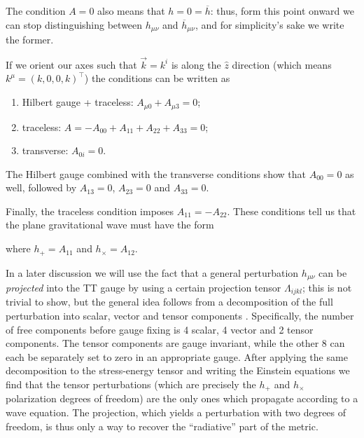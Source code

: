 \documentclass[main.tex]{subfiles}
\begin{document}
The condition \(A = 0\) also means that \(h = 0 = \overline{h}\): thus, form this point onward we can stop distinguishing between \(h_{\mu \nu }\) and  \(\overline{h}_{\mu \nu }\), and for simplicity's sake we write the former. 

If we orient our axes such that \(\vec{k} = k^{i}\) is along the \(\hat{z}\) direction (which means \(k^{\mu } = (k, 0, 0, k)^{\top}\)) the conditions can be written as 
\begin{enumerate}
    \item Hilbert gauge + traceless: \(A_{\mu 0}+ A_{\mu 3} = 0\);
    \item traceless: \(A = - A_{00} + A_{11} + A_{22} + A_{33} = 0 \);
    \item transverse: \(A_{0i} = 0\). 
\end{enumerate}

The Hilbert gauge combined with the transverse conditions show that \(A_{00} = 0\) as well, followed by \(A_{13} = 0\), \(A_{23} = 0\) and \(A_{33} = 0\). 

Finally, the traceless condition imposes \(A_{11} = - A_{22} \).
These conditions tell us that the plane gravitational wave must have the form 
%

%

%
where \(h_+ = A_{11} \) and \(h_\times = A_{12} \). 

In a later discussion we will use the fact that a general perturbation \(h_{\mu \nu }\) can be \emph{projected} into the \ac{TT} gauge by using a certain projection tensor \(\Lambda_{ijkl}\); this is not trivial to show, but the general idea follows from a decomposition of the full perturbation into scalar, vector and tensor components \cite[sec.\ 7.2]{carrollSpacetimeGeometryIntroduction2019}.
Specifically, the number of free components before gauge fixing is 4 scalar, 4 vector and 2 tensor components. 
The tensor components are gauge invariant, while the other 8 can each be separately set to zero in an appropriate gauge.
After applying the same decomposition to the stress-energy tensor and writing the Einstein equations we find that the tensor perturbations (which are precisely the \(h_{+}\) and \(h_{ \times }\) polarization degrees of freedom) are the only ones which propagate according to a wave equation. 
The projection, which yields a perturbation with two degrees of freedom, is thus only a way to recover the ``radiative'' part of the metric. 
\end{document}
